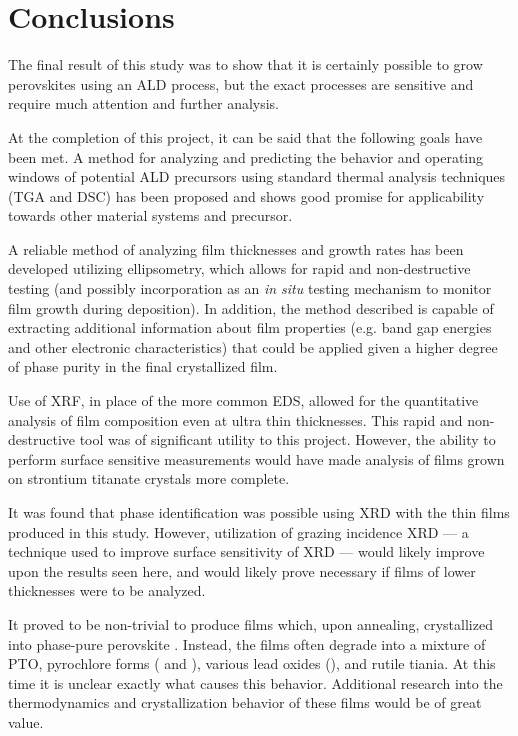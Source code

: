 \chapter{Conclusions}
\label{ch:Conc}
\thispagestyle{empty}


The final result of this study was to show that it is certainly possible to grow perovskites using an ALD process, but the exact processes are sensitive and require much attention and further analysis.  

At the completion of this project, it can be said that the following goals have been met. A method for analyzing and predicting the behavior and operating windows of potential ALD precursors using standard thermal analysis techniques (TGA and DSC) has been proposed and shows good promise for applicability towards other material systems and precursor. 

A reliable method of analyzing film thicknesses and growth rates has been developed utilizing ellipsometry, which allows for rapid and non-destructive testing (and possibly incorporation as an \emph{in situ} testing mechanism to monitor film growth during deposition). In addition, the method described is capable of extracting additional information about film properties (e.g. band gap energies and other electronic characteristics) that could be applied given a higher degree of phase purity in the final crystallized film. 

Use of XRF, in place of the more common EDS, allowed for the quantitative analysis of film composition even at ultra thin thicknesses. This rapid and non-destructive tool was of significant utility to this project. However, the ability to perform surface sensitive measurements would have made analysis of films grown on strontium titanate crystals more complete. 

It was found that phase identification was possible using XRD with the thin films produced in this study. However, utilization of grazing incidence XRD --- a technique used to improve surface sensitivity of XRD --- would likely improve upon the results seen here, and would likely prove necessary if films of lower thicknesses were to be analyzed. 

It proved to be non-trivial to produce films which, upon annealing, crystallized into phase-pure perovskite \PTO{}. Instead, the films often degrade into a mixture of PTO, pyrochlore forms ( and ), various lead oxides (), and rutile tiania. At this time it is unclear exactly what causes this behavior. Additional research into the thermodynamics and crystallization behavior of these films would be of great value. 

